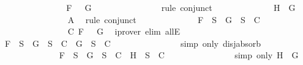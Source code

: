 \begin{isabellebody}
\ \ \ \ \ \ \ \ \ \ \ \ \isamarkupfalse%
\ \isamarkupfalse%
\ {\isachardoublequoteopen}F\ {\isacharequal}\ \isactrlbold {\isasymnot}{\isacharparenleft}\isactrlbold {\isasymnot}\ G{\isacharparenright}{\isachardoublequoteclose}\isanewline
\ \ \ \ \ \ \ \ \ \ \ \ \ \ \isamarkupfalse%
\ {\isacharparenleft}rule\ conjunct{}{\isacharparenright}\isanewline
\ \ \ \ \ \ \ \ \ \ \ \ \isamarkupfalse%
\ {\isachardoublequoteopen}H\ {\isacharequal}\ G{\isachardoublequoteclose}\isanewline
\ \ \ \ \ \ \ \ \ \ \ \ \ \ \isamarkupfalse%
\ A{}\ \isamarkupfalse%
\ {\isacharparenleft}rule\ conjunct{}{\isacharparenright}\isanewline
\ \ \ \ \ \ \ \ \ \ \ \ \isamarkupfalse%
\ {\isachardoublequoteopen}F\ {\isasymin}\ S\ {\isasymlongrightarrow}\ {\isacharbraceleft}G{\isacharbraceright}\ {\isasymunion}\ S\ {\isasymin}\ C{\isachardoublequoteclose}\isanewline
\ \ \ \ \ \ \ \ \ \ \ \ \ \ \isamarkupfalse%
\ C{}\ {\isacartoucheopen}F\ {\isacharequal}\ \isactrlbold {\isasymnot}{\isacharparenleft}\isactrlbold {\isasymnot}\ G{\isacharparenright}{\isacartoucheclose}\ \isamarkupfalse%
\ {\isacharparenleft}iprover\ elim{\isacharcolon}\ allE{\isacharparenright}\isanewline
\ \ \ \ \ \ \ \ \ \ \ \ \isamarkupfalse%
\ \isamarkupfalse%
\ {\isachardoublequoteopen}F\ {\isasymin}\ S\ {\isasymlongrightarrow}\ {\isacharbraceleft}G{\isacharbraceright}\ {\isasymunion}\ S\ {\isasymin}\ C\ {\isasymor}\ {\isacharbraceleft}G{\isacharbraceright}\ {\isasymunion}\ S\ {\isasymin}\ C{\isachardoublequoteclose}\isanewline
\ \ \ \ \ \ \ \ \ \ \ \ \ \ \isamarkupfalse%
\ {\isacharparenleft}simp\ only{\isacharcolon}\ disj{\isacharunderscore}absorb{\isacharparenright}\isanewline
\ \ \ \ \ \ \ \ \ \ \ \ \isamarkupfalse%
\ {\isachardoublequoteopen}F\ {\isasymin}\ S\ {\isasymlongrightarrow}\ {\isacharbraceleft}G{\isacharbraceright}\ {\isasymunion}\ S\ {\isasymin}\ C\ {\isasymor}\ {\isacharbraceleft}H{\isacharbraceright}\ {\isasymunion}\ S\ {\isasymin}\ C{\isachardoublequoteclose}\isanewline
\ \ \ \ \ \ \ \ \ \ \ \ \ \ \isamarkupfalse%
\ {\isacharparenleft}simp\ only{\isacharcolon}\ {\isacartoucheopen}H\ {\isacharequal}\ G{\isacartoucheclose}{\isacharparenright}\isanewline
\ \ \ \ \ \ \ \ \ \ \isamarkupfalse%
\isanewline
\ \ \ \ \ \ \ \ \isamarkupfalse%
\isanewline
\ \ \ \ \ \ \isamarkupfalse%
\isanewline

\end{isabellebody}

